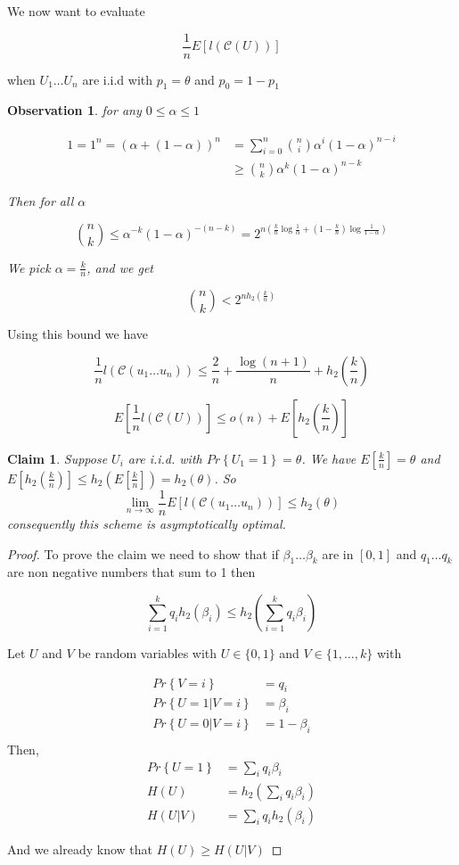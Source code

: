 \documentclass{article}
\newtheorem{claim}{Claim}[section]
\newtheorem{observation}{Observation}[section]
\theoremstyle{definition} %
\renewcommand{\Pr}[1]{Pr\left\{#1\right\}}
\newcommand{\Ex}[1]{E\left[#1\right]}
\newcommand{\pfrac}[2]{\left( \frac{#1}{#2} \right)}
\def\C{\mathscr{C}}
\begin{document}
We now want to evaluate

\[
  \frac 1 n \Ex{l(\C(U))}
\]

when $U_1 \dots U_n$ are i.i.d with $p_1 = \theta$ and $p_0 = 1 - p_1$

\begin{observation}

for any $0 \leq \alpha \leq 1$

\begin{align*}
  1 = 1^n = (\alpha + (1-\alpha))^n &= \sum_{i=0}^n {n \choose i} \alpha^i (1-\alpha)^{n-i}\\
  & \geq {n \choose k} \alpha^k (1-\alpha)^{n-k}
\end{align*}

Then for all $\alpha$

\[
{n \choose k} \leq \alpha^{-k}(1-\alpha)^{-(n-k)} = 2^{n(\frac k n \log \frac 1 \alpha + (1-\frac k n) \log \frac 1 {1-\alpha})}
\]

We pick $\alpha = \frac k n$, and we get

\[
  {n \choose k} < 2^{n h_2 \pfrac k n}
\]

\end{observation}

Using this bound we have

\[
  \frac 1 n l(\C(u_1 \dots u_n)) \leq \frac 2 n + \frac {\log (n+1)} n + h_2\pfrac k n
\]

\[
  \Ex{\frac 1 n l(\C(U))} \leq o(n) + \Ex{h_2 \pfrac k n}
\]

\begin{claim}
Suppose $U_i$ are i.i.d. with $\Pr{U_1=1}=\theta$. We have $\Ex{ \frac k n} = \theta$ and $\Ex{h_2 \pfrac k n } \leq h_2(\Ex{\frac k n}) = h_2(\theta)$. So
\[
  \lim_{n\to \infty} \frac 1 n \Ex{l(\C(u_1\dots u_n))} \leq h_2(\theta)
\]
consequently this scheme is asymptotically optimal.
\end{claim}

\begin{proof}
  To prove the claim we need to show that if $\beta_1\dots \beta_k$ are in $[0,1]$ and $q_1 \dots q_k$ are non negative numbers that sum to 1 then

  \[
    \sum_{i=1}^k q_i h_2(\beta_i) \leq h_2 \left(\sum_{i=1}^k q_i \beta_i \right)
  \]

  Let $U$ and $V$ be random variables with $U \in \{0,1\}$ and $V \in \{1,\dots,k\}$ with

  \begin{align*}
    \Pr{V=i} &= q_i\\
    \Pr{U=1|V=i} &= \beta_i\\
    \Pr{U=0|V=i} &= 1- \beta_i\\
  \end{align*}
  Then,
  \begin{align*}
    \Pr{U=1} &= \sum_i q_i \beta_i\\
    H(U) &= h_2\left(\sum_i q_i \beta_i \right)\\
    H(U|V) &= \sum_i q_i h_2(\beta_i)
  \end{align*}

  And we already know that $H(U) \geq H(U|V)$
\end{proof}
\end{document}
